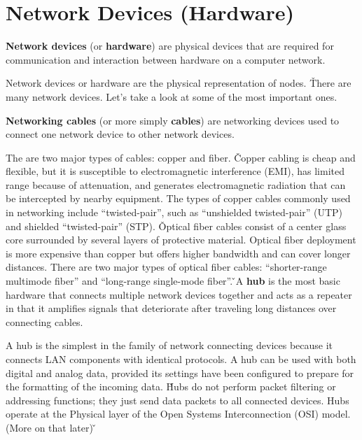 \newpage
\section{Network Devices (Hardware)}

\textbf{Network devices} (or \textbf{hardware}) are physical devices that are required for communication and
interaction between hardware on a computer network.
\ed

Network devices or hardware are the physical representation of nodes. \v

There are many network devices. Let's take a look at some of the most important ones.

\textbf{Networking cables} (or more simply \textbf{cables}) are networking devices used to connect one network device to
other network devices.
\ed

The are two major types of cables: copper and fiber. \v

Copper cabling is cheap and flexible, but it is susceptible to electromagnetic interference (EMI), has limited range
because of attenuation, and generates electromagnetic radiation that can be intercepted by nearby equipment. The
types of copper cables commonly used in networking include ``twisted-pair'', such as ``unshielded twisted-pair''
(UTP) and shielded ``twisted-pair'' (STP). \v

Optical fiber cables consist of a center glass core surrounded by several layers of protective material. Optical
fiber deployment is more expensive than copper but offers higher bandwidth and can cover longer distances. There are
two major types of optical fiber cables: ``shorter-range multimode fiber'' and ``long-range single-mode fiber''. \v

\bd[Hub]
A \textbf{hub} is the most basic hardware that connects multiple network devices together and acts as a repeater in
that it amplifies signals that deteriorate after traveling long distances over connecting cables.
\ed


A hub is the simplest in the family of network connecting devices because it connects LAN components with identical
protocols. A hub can be used with both digital and analog data, provided its settings have been configured to prepare
for the formatting of the incoming data. \v

Hubs do not perform packet filtering or addressing functions; they just send data packets to all connected devices.
Hubs operate at the Physical layer of the Open Systems Interconnection (OSI) model. (More on that later) \v

